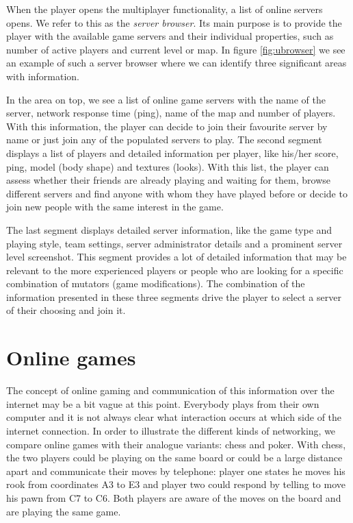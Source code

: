 When the player opens the multiplayer functionality, a list of online servers opens. We refer to this as the \emph{server browser}. Its main purpose is to provide the player with the available game servers and their individual properties, such as number of active players and current level or map. In figure \ref{fig:ubrowser} we see an example of such a server browser where we can identify three significant areas with information.

In the area on top, we see a list of online game servers with the name of the server, network response time (ping), name of the map and number of players. With this information, the player can decide to join their favourite server by name or just join any of the populated servers to play. The second segment displays a list of players and detailed information per player, like his/her score, ping, model (body shape) and textures (looks). With this list, the player can assess whether their friends are already playing and waiting for them, browse different servers and find anyone with whom they have played before or decide to join new people with the same interest in the game.

The last segment displays detailed server information, like the game type and playing style, team settings, server administrator details and a prominent server level screenshot. This segment provides a lot of detailed information that may be relevant to the more experienced players or people who are looking for a specific combination of mutators (game modifications). The combination of the information presented in these three segments drive the player to select a server of their choosing and join it.

\section{Online games}
The concept of online gaming and communication of this information over the internet may be a bit vague at this point. Everybody plays from their own computer and it is not always clear what interaction occurs at which side of the internet connection. In order to illustrate the different kinds of networking, we compare online games with their analogue variants: chess and poker. With chess, the two players could be playing on the same board or could be a large distance apart and communicate their moves by telephone: player one states he moves his rook from coordinates A3 to E3 and player two could respond by telling to move his pawn from C7 to C6. Both players are aware of the moves on the board and are playing the same game. 

